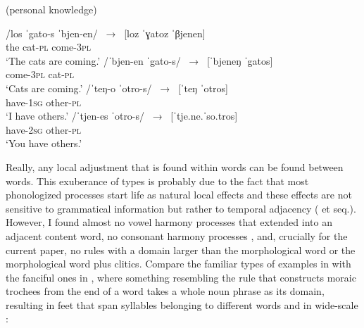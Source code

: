 \documentclass[output=paper,
modfonts
]{LSP/langsci}
\begin{document}
\begin{exe}
\ex \label{ex:kaisse:1}  (personal knowledge)
\begin{xlist}
\ex \label{ex:kaisse:1a} \gll /los ˈgato-s ˈbjen-en/ \ → \ [loz ˈɣatoz ˈβjenen]\\
the  cat-\textsc{pl}  come-3\textsc{pl}\\
\glt `The cats are coming.'
\ex \label{ex:kaisse:1b} \gll /ˈbjen-en ˈgato-s/ \ → \ [ˈbjeneŋ ˈgatos]\\
come-3\textsc{pl} cat-\textsc{pl}\\
\glt `Cats are coming.'
\ex \label{ex:kaisse:1c} \gll /ˈteŋ-o  ˈotro-s/ \ → \ [ˈteŋ ˈotros]\\
have-\textsc{1sg} other-\textsc{pl}\\
\glt `I have others.'
\ex \label{ex:kaisse:1d} \gll /ˈtjen-es ˈotro-s/ \ → \ [ˈtje.ne.ˈso.tros]\\
have-\textsc{2sg} other-\textsc{pl}\\
\glt `You have others.'
\end{xlist}
\end{exe}

\noindent Really, any local adjustment that is found within words can be found between words. This exuberance of types is probably due to the fact that most phonologized processes start life as natural local effects and these effects are not sensitive to grammatical information but rather to temporal adjacency (\citealt{kiparsky1982b} et seq.). However, I found almost no vowel harmony processes that extended into an adjacent content word, no consonant harmony processes \citep{hansson2010}, and, crucially for the current paper, no  rules with a domain larger than the morphological word or the morphological word plus clitics. Compare the familiar types of examples in  with the fanciful ones in , where something resembling the  rule that constructs moraic trochees from the end of a word takes a whole noun phrase as its domain, resulting in feet that span syllables belonging to different words and in wide-scale :
\end{document}
